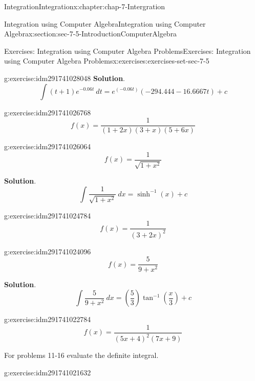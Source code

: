 \documentclass[oneside,10pt,]{book}
\numberwithin{equation}{section}
\begin{document}
\begin{chapterptx}{Integration}{}{Integration}{}{}{x:chapter:chap-7-Intergration}
\begin{sectionptx}{Integration using Computer Algebra}{}{Integration using Computer Algebra}{}{}{x:section:sec-7-5-IntroductionComputerAlgebra}
\begin{exercises-subsection}{Exercises: Integration using Computer Algebra Problems}{}{Exercises: Integration using Computer Algebra Problems}{}{}{x:exercises:exercises-set-sec-7-5}
\begin{divisionexercise}{5}{}{}{g:exercise:idm291741028048}
\noindent\textbf{Solution}.\hypertarget{g:solution:idm291741027504}{}\quad{}%
\begin{equation*}
\int (t+1) e^{-0.06t}\ dt =e^(-0.06t) (-294.444 - 16.6667 t)+c
\end{equation*}
\end{divisionexercise}%
\begin{divisionexercise}{6}{}{}{g:exercise:idm291741026768}%
%
\begin{equation*}
f(x)=\frac{1}{(1+2x)(3+x)(5+6x) }
\end{equation*}
\end{divisionexercise}%
\begin{divisionexercise}{7}{}{}{g:exercise:idm291741026064}%
%
\begin{equation*}
f(x)=\frac{1}{\sqrt{1+x^2}}
\end{equation*}
\par\smallskip%
\noindent\textbf{Solution}.\hypertarget{g:solution:idm291741025520}{}\quad{}%
\begin{equation*}
\int \frac{1}{\sqrt{1+x^2}}\ dx= \sinh^{-1}(x)+c
\end{equation*}
\end{divisionexercise}%
\begin{divisionexercise}{8}{}{}{g:exercise:idm291741024784}%
%
\begin{equation*}
f(x)=\frac{1}{(3+2x)^2} 
\end{equation*}
\end{divisionexercise}%
\begin{divisionexercise}{9}{}{}{g:exercise:idm291741024096}%
%
\begin{equation*}
f(x)=\frac{5}{9+x^2 }
\end{equation*}
\par\smallskip%
\noindent\textbf{Solution}.\hypertarget{g:solution:idm291741023552}{}\quad{}%
\begin{equation*}
\int \frac{5}{9+x^2 }\ dx = \left(\frac{5}{3}\right)\tan^{-1}\left(\frac{x}{3}\right)+c
\end{equation*}
\end{divisionexercise}%
\begin{divisionexercise}{10}{}{}{g:exercise:idm291741022784}%
%
\begin{equation*}
f(x)=\frac{1}{(5x+4)^2 (7x+9)}
\end{equation*}
\end{divisionexercise}%
For problems 11-16 evaluate the definite integral.%
\begin{divisionexercise}{11}{}{}{g:exercise:idm291741021632}%

\end{divisionexercise}
\end{exercises-subsection}
\end{sectionptx}
\end{chapterptx}
\end{document}
